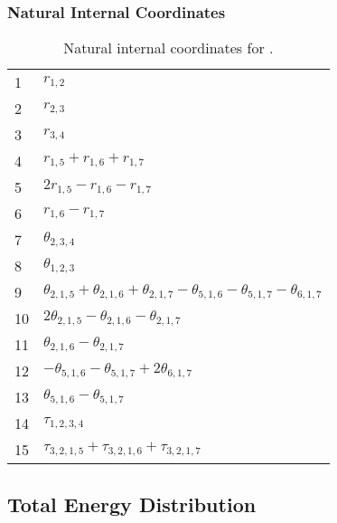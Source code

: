 \documentclass[10pt,oneside]{article}
\begin{document}
\begin{table}[h!]
\subsubsection*{Natural Internal Coordinates}
\centering
\caption{Natural internal coordinates for .}
\small
\begin{tabular}{ll}
\toprule
  1   & $r_{1,2}$ \\
  2   & $r_{2,3}$ \\
  3   & $r_{3,4}$ \\
  4   & $r_{1,5} + r_{1,6} + r_{1,7}$ \\
  5   & $2r_{1,5} - r_{1,6} - r_{1,7}$ \\
  6   & $r_{1,6} - r_{1,7}$ \\
  7   & $\theta_{2,3,4}$ \\
  8   & $\theta_{1,2,3}$ \\
  9   & $\theta_{2,1,5} + \theta_{2,1,6} + \theta_{2,1,7} - \theta_{5,1,6} - \theta_{5,1,7} - \theta_{6,1,7}$ \\
  10  & $2\theta_{2,1,5} - \theta_{2,1,6} - \theta_{2,1,7}$ \\
  11  & $\theta_{2,1,6} - \theta_{2,1,7}$ \\
  12  & $-\theta_{5,1,6} - \theta_{5,1,7} + 2\theta_{6,1,7}$ \\
  13  & $\theta_{5,1,6} - \theta_{5,1,7}$ \\
  14  & $\tau_{1,2,3,4}$ \\
  15  & $\tau_{3,2,1,5} + \tau_{3,2,1,6} + \tau_{3,2,1,7}$ \\
\bottomrule
\end{tabular}
\end{table}

\begin{table}
\subsection*{Total Energy Distribution}
\centering\end{table}

\clearpage

\subsection{}
\end{document}
